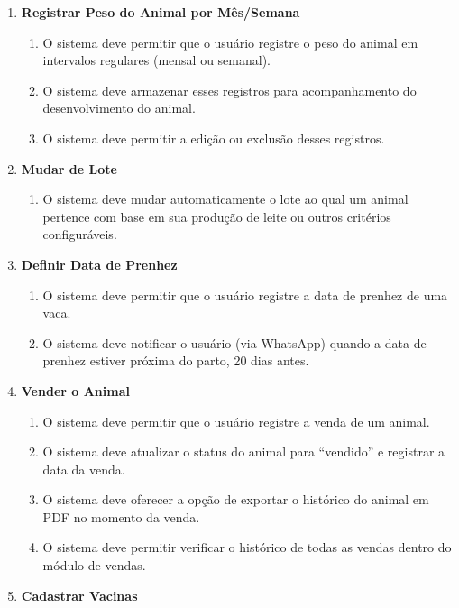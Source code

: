 \documentclass[12pt, a4paper]{article}
\begin{document}
\begin{spacing}{1.5}
\begin{enumerate}[label=RF0\arabic{*}.]
\begin{enumerate}[label=RF04.0\arabic{*}]
    \end{enumerate}
    \item \textbf{Registrar Peso do Animal por Mês/Semana}
    \begin{enumerate}[label=RF05.0\arabic{*}]
        \item O sistema deve permitir que o usuário registre o peso do animal em intervalos regulares (mensal ou semanal).
        \item O sistema deve armazenar esses registros para acompanhamento do desenvolvimento do animal.
        \item O sistema deve permitir a edição ou exclusão desses registros.
    \end{enumerate}
    \item \textbf{Mudar de Lote}
    \begin{enumerate}[label=RF06.0\arabic{*}]
        \item O sistema deve mudar automaticamente o lote ao qual um animal pertence com base em sua produção de leite ou outros critérios configuráveis.
    \end{enumerate}
    \item \textbf{Definir Data de Prenhez}
    \begin{enumerate}[label=RF07.0\arabic{*}]
        \item O sistema deve permitir que o usuário registre a data de prenhez de uma vaca.
        \item O sistema deve notificar o usuário (via WhatsApp) quando a data de prenhez estiver próxima do parto, 20 dias antes.
    \end{enumerate}
    \item \textbf{Vender o Animal}
    \begin{enumerate}[label=RF8.0\arabic{*}]
        \item O sistema deve permitir que o usuário registre a venda de um animal.
        \item O sistema deve atualizar o status do animal para ``vendido'' e registrar a data da venda.
        \item O sistema deve oferecer a opção de exportar o histórico do animal em PDF no momento da venda.
        \item O sistema deve permitir verificar o histórico de todas as vendas dentro do módulo de vendas.
    \end{enumerate}
    \item \textbf{Cadastrar Vacinas}
    \begin{enumerate}[label=RF9.0\arabic{*}]

\end{enumerate}
\end{enumerate}
\end{spacing}
\end{document}

